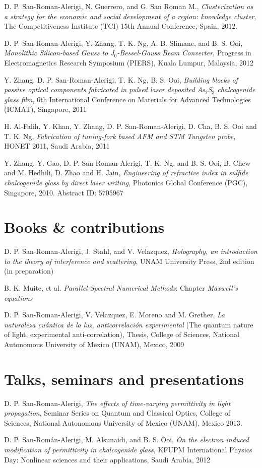 \documentclass[margin,10pt]{res}
\newcommand{\subs}[1]{\normalfont #1}
\newcommand{\secs}[1]{\normalsize{\section{\subs{#1}}}}
\newcommand{\UNAM}{National Autonomous University of Mexico (UNAM)}
\begin{document}
D. P. San-Roman-Alerigi, N. Guerrero, and G. San Roman M., \emph{Clusterization as a strategy for the economic and social development of a region: knowledge cluster}, The Competitiveness Institute (TCI) 15th Annual Conference, Spain, 2012.

D. P. San-Roman-Alerigi, Y. Zhang, T. K. Ng, A. B. Slimane, and B. S. Ooi, \emph{Monolithic Silicon-based Gauss to J$_0$-Bessel-Gauss Beam Converter}, Progress in Electromagnetics Research Symposium (PIERS), Kuala Lumpur, Malaysia, 2012

Y. Zhang, D. P. San-Roman-Alerigi, T. K. Ng, B. S. Ooi, \emph{Building blocks of passive optical components fabricated in pulsed laser deposited As$_2$S$_3$ chalcogenide glass film}, 6th International Conference on Materials for Advanced Technologies (ICMAT), Singapore, 2011

H. Al-Falih, Y. Khan, Y. Zhang, D. P. San-Roman-Alerigi, D. Cha, B. S. Ooi and T. K. Ng, \emph{Fabrication of tuning-fork based AFM and STM Tungsten probe}, HONET 2011, Saudi Arabia, 2011

Y. Zhang, Y. Gao, D. P. San-Roman-Alerigi, T. K. Ng, and B. S. Ooi, B. Chew and M. Hedhili, D. Zhao and H. Jain, \emph{Engineering of refractive index in sulfide chalcogenide glass by direct laser writing}, Photonics Global Conference (PGC), Singapore, 2010. Abstract ID: 5705967


\secs{Books \& contributions}

D. P. San-Roman-Alerigi, J. Stahl, and V. Velazquez, \emph{Holography, an introduction to the theory of interference and scattering}, UNAM University Press, 2nd edition (in preparation)

B. K. Muite, et al. \emph{Parallel Spectral Numerical Methods}: Chapter \emph{Maxwell's equations}

D. P. San-Roman-Alerigi, V. Velazquez, E. Moreno and M. Grether, \emph{La naturaleza cu\'antica de la luz, anticorrelaci\'on experimental} (The quantum nature of light, experimental anti-correlation), Thesis, College of Sciences, \UNAM, Mexico, 2009


\secs{Talks, seminars and presentations}

D. P. San-Roman-Alerigi, \emph{The effects of time-varying permittivity in light propagation}, Seminar Series on Quantum and Classical Optics, College of Sciences, \UNAM, Mexico 2013.

D. P. San-Román-Alerigi, M. Alsunaidi, and B. S. Ooi, \emph{On the electron induced modification of permittivity in chalcogenide glass}, KFUPM International Physics Day: Nonlinear sciences and their applications, Saudi Arabia, 2012
\end{document}
